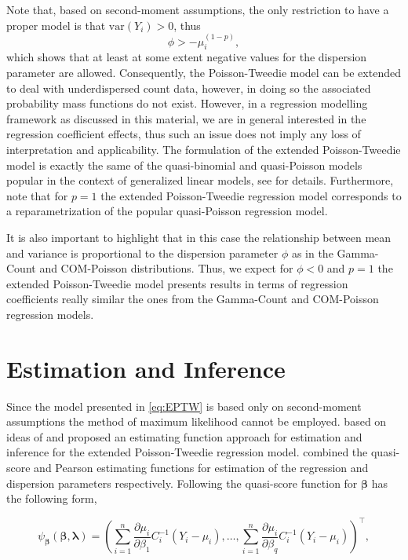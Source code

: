 \documentclass[9pt,a5paper,]{book}
\theoremstyle{definition}
\theoremstyle{definition}
\theoremstyle{remark}
\begin{document}
Note that, based on second-moment assumptions, the only restriction to
have a proper model is that \(\mathrm{var}(Y_i) > 0\), thus
\[\phi > - \mu^{(1-p)}_i,\] which shows that at least at some extent
negative values for the dispersion parameter are allowed. Consequently,
the Poisson-Tweedie model can be extended to deal with underdispersed
count data, however, in doing so the associated probability mass
functions do not exist. However, in a regression modelling framework as
discussed in this material, we are in general interested in the
regression coefficient effects, thus such an issue does not imply any
loss of interpretation and applicability. The formulation of the
extended Poisson-Tweedie model is exactly the same of the quasi-binomial
and quasi-Poisson models popular in the context of generalized linear
models, see \citep[\citet{Nelder1972}]{Wedderburn1974} for details.
Furthermore, note that for \(p = 1\) the extended Poisson-Tweedie
regression model corresponds to a reparametrization of the popular
quasi-Poisson regression model.

It is also important to highlight that in this case the relationship
between mean and variance is proportional to the dispersion parameter
\(\phi\) as in the Gamma-Count and COM-Poisson distributions. Thus, we
expect for \(\phi < 0\) and \(p = 1\) the extended Poisson-Tweedie model
presents results in terms of regression coefficients really similar the
ones from the Gamma-Count and COM-Poisson regression models.

\section{Estimation and Inference}\label{estimation-and-inference}

Since the model presented in \eqref{eq:EPTW} is based only on
second-moment assumptions the method of maximum likelihood cannot be
employed. \citep{Bonat2016b} based on ideas of \citep{Jorgensen2004} and
\citep{Bonat2016a} proposed an estimating function approach for
estimation and inference for the extended Poisson-Tweedie regression
model. \citep{Bonat2016b} combined the quasi-score and Pearson
estimating functions for estimation of the regression and dispersion
parameters respectively. Following \citep{Bonat2016b} the quasi-score
function for \(\boldsymbol{\beta}\) has the following form,

\begin{equation*}
\psi_{\boldsymbol{\beta}}(\boldsymbol{\beta}, \boldsymbol{\lambda}) = \left (\sum_{i=1}^n \frac{\partial \mu_i}{\partial \beta_1}C^{-1}_i(Y_i - \mu_i), \ldots, \sum_{i=1}^n \frac{\partial \mu_i}{\partial \beta_q}C^{-1}_i(Y_i - \mu_i)  \right )^\top,
\end{equation*}
\end{document}
